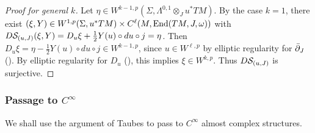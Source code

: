 \begin{proof}[Proof for general $k$]
	Let $\eta \in W^{k - 1, p} (\Sigma, \Lambda^{0, 1} \otimes_J u^*TM)$. 
	By the case $k = 1$, there exist $(\xi, Y) \in W^{1, p} (\Sigma, u^*TM) 
	\times C^\ell(M, \operatorname{End}(TM, J, \omega))$ with 
	$D{\mathcal{S}}_{(u, J)} (\xi, Y) = D_u\xi + \frac{1}{2} Y(u) \circ du \circ j = \eta$. 
	Then $D_u\xi = \eta - \frac{1}{2} Y(u) \circ du \circ j \in W^{k - 1, p}$, 
	since $u \in W^{\ell, p}$ by elliptic regularity for ${\bar{\partial}}_J$ 
	(\cite[Theorem~B.4.1]{MS}). 
	By elliptic regularity for $D_u$ (\cite[Theorem~C.2.3]{MS}), 
	this implies $\xi \in W^{k, p}$. 
	Thus $D{\mathcal{S}}_{(u, J)}$ is surjective.
\end{proof}

\subsubsection{Passage to \texorpdfstring{$C^\infty$}{C^infty}}
We shall use the argument of Taubes to pass to 
$C^\infty$ almost complex structures.

